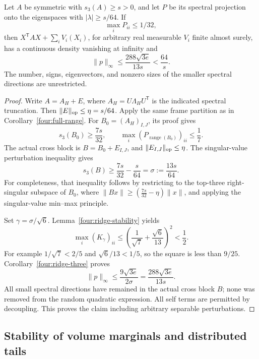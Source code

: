 \begin{theorem}\label{four:window}
Let \(A\) be symmetric with \(s_3(A)\geq s>0\), and let \(P\)
be its spectral projection onto the eigenspaces with
\(|\lambda|\geq s/64\).  If
\begin{equation}\label{four:window-hypothesis}
 \max_iP_{ii}\leq1/32,
\end{equation}
then \(X^{\mathsf T}AX+\sum_iV_i(X_i)\), for arbitrary real
measurable \(V_i\) finite almost surely, has a continuous density
vanishing at infinity and
\begin{equation}\label{four:window-bound}
 \|p\|_\infty\leq\frac{288\sqrt{3e}}{13s}<\frac{64}{s}.
\end{equation}
The number, signs, eigenvectors, and nonzero sizes of the smaller
spectral directions are unrestricted.
\end{theorem}
\begin{proof}
Write \(A=A_H+E\), where
\(A_H=U\Lambda_HU^{\mathsf T}\) is the indicated spectral
truncation.  Then \(\|E\|_{\rm op}\leq\eta=s/64\).
Apply the same frame partition as in
Corollary~\ref{four:full-range}.  For
\(B_0=(A_H)_{I,J}\), its proof gives
\[
 s_3(B_0)\geq\frac{7s}{32},\qquad
 \max_i(P_{\operatorname{range}(B_0)})_{ii}\leq\frac17.
\]
The actual cross block is \(B=B_0+E_{I,J}\), and
\(\|E_{I,J}\|_{\rm op}\leq\eta\).  The singular-value
perturbation inequality gives
\[
 s_3(B)\geq\frac{7s}{32}-\frac{s}{64}
          =\sigma:=\frac{13s}{64}.
\]
For completeness, that inequality follows by restricting to the
top-three right-singular subspace of \(B_0\), where
\(\|Bx\|\geq(\frac{7s}{32}-\eta)\|x\|\), and applying the
singular-value min--max principle.

Set \(\gamma=\sigma/\sqrt6\).
Lemma~\ref{four:ridge-stability} yields
\[
 \max_i(K_\gamma)_{ii}
 \leq\left(\frac1{\sqrt7}+\frac{\sqrt6}{13}\right)^2<\frac12.
\]
For example \(1/\sqrt7<2/5\) and \(\sqrt6/13<1/5\), so
the square is less than \(9/25\).
Corollary~\ref{four:ridge-three} proves
\[
 \|p\|_\infty\leq\frac{9\sqrt{3e}}{2\sigma}
              =\frac{288\sqrt{3e}}{13s}.
\]
All small spectral directions have remained in the actual cross
block \(B\); none was removed from the random quadratic expression.
All self terms are permitted by decoupling.  This proves the
claim including arbitrary separable perturbations.
\end{proof}

\subsection{Stability of volume marginals and distributed tails}

